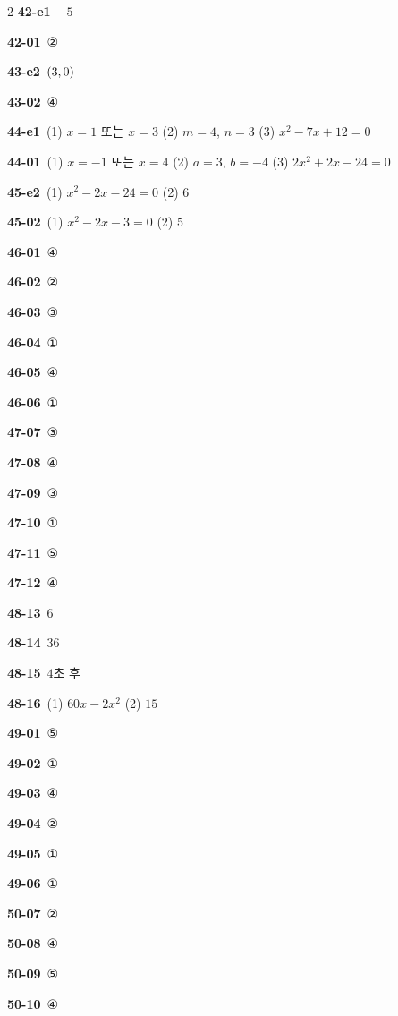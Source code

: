\documentclass[10pt,a4paper]{article}
\begin{document}
\begin{multicols}{2}
\noindent\textbf{42-e1}\ $-5$\par
\noindent\textbf{42-01}\ ②\par
\noindent\textbf{43-e2}\ $(3{,}\mkern3mu 0)$\par
\noindent\textbf{43-02}\ ④\par
\noindent\textbf{44-e1}\ (1) $x=1$ 또는 $x=3$ (2) $m=4$, $n=3$ (3) $x^2-7x+12=0$\par
\noindent\textbf{44-01}\ (1) $x=-1$ 또는 $x=4$ (2) $a=3$, $b=-4$ (3) $2x^2+2x-24=0$\par
\noindent\textbf{45-e2}\ (1) $x^2-2x-24=0$ (2) $6$\par
\noindent\textbf{45-02}\ (1) $x^2-2x-3=0$ (2) $5$\par
\noindent\textbf{46-01}\ ④\par
\noindent\textbf{46-02}\ ②\par
\noindent\textbf{46-03}\ ③\par
\noindent\textbf{46-04}\ ①\par
\noindent\textbf{46-05}\ ④\par
\noindent\textbf{46-06}\ ①\par
\noindent\textbf{47-07}\ ③\par
\noindent\textbf{47-08}\ ④\par
\noindent\textbf{47-09}\ ③\par
\noindent\textbf{47-10}\ ①\par
\noindent\textbf{47-11}\ ⑤\par
\noindent\textbf{47-12}\ ④\par
\noindent\textbf{48-13}\ $6$\par
\noindent\textbf{48-14}\ $36$\par
\noindent\textbf{48-15}\ $4$초 후\par
\noindent\textbf{48-16}\ (1) $60x-2x^2$ (2) $15$\par
\noindent\textbf{49-01}\ ⑤\par
\noindent\textbf{49-02}\ ①\par
\noindent\textbf{49-03}\ ④\par
\noindent\textbf{49-04}\ ②\par
\noindent\textbf{49-05}\ ①\par
\noindent\textbf{49-06}\ ①\par
\noindent\textbf{50-07}\ ②\par
\noindent\textbf{50-08}\ ④\par
\noindent\textbf{50-09}\ ⑤\par
\noindent\textbf{50-10}\ ④\par

\end{multicols}
\end{document}

